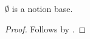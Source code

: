 

\begin{classification}\label{notion_reference_empty_base}
    $\emptyset$ is a notion base.
\end{classification}
\begin{proof}
    Follows by .
\end{proof}
